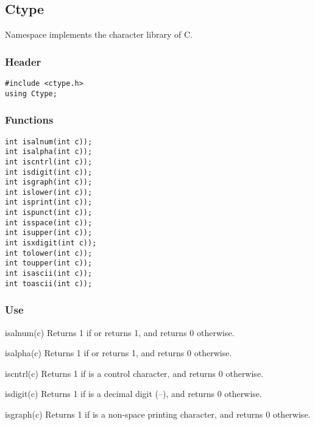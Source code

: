 \subsection{Ctype}

Namespace  implements the character library of C\@.

\subsubsection*{Header}
\begin{verbatim}
#include <ctype.h>
using Ctype;
\end{verbatim}

\subsubsection*{Functions}
\begin{verbatim}
int isalnum(int c));
int isalpha(int c));
int iscntrl(int c));
int isdigit(int c));
int isgraph(int c));
int islower(int c));
int isprint(int c));
int ispunct(int c));
int isspace(int c));
int isupper(int c));
int isxdigit(int c));
int tolower(int c));
int toupper(int c));
int isascii(int c));
int toascii(int c));
\end{verbatim}

\subsubsection*{Use}

\begin{defun}{isalnum}{(c)}
Returns 1 if  or  returns 1,
and returns 0 otherwise.
\end{defun}

\begin{defun}{isalpha}{(c)}
Returns 1 if  or  returns 1,
and returns 0 otherwise.
\end{defun}

\begin{defun}{iscntrl}{(c)}
Returns 1 if  is a control character,
and returns 0 otherwise.
\end{defun}

\begin{defun}{isdigit}{(c)}
Returns 1 if  is a decimal digit (--), and
returns 0 otherwise.
\end{defun}

\begin{defun}{isgraph}{(c)}
Returns 1 if  is a non-space printing character, and returns 0
otherwise.
\end{defun}

